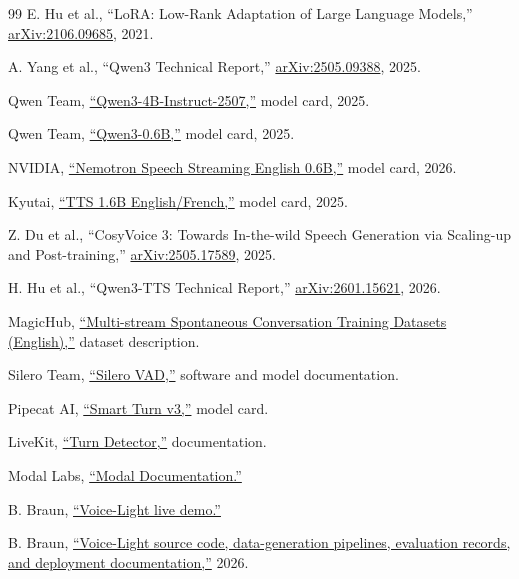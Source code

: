 \documentclass[10pt,twocolumn]{article}
\begin{document}
\begin{thebibliography}{99}
E. Hu et al., ``LoRA: Low-Rank Adaptation of Large Language Models,''
\href{https://arxiv.org/abs/2106.09685}{arXiv:2106.09685}, 2021.

A. Yang et al., ``Qwen3 Technical Report,''
\href{https://arxiv.org/abs/2505.09388}{arXiv:2505.09388}, 2025.

Qwen Team, \href{https://huggingface.co/Qwen/Qwen3-4B-Instruct-2507}
{``Qwen3-4B-Instruct-2507,''} model card, 2025.

Qwen Team, \href{https://huggingface.co/Qwen/Qwen3-0.6B}{``Qwen3-0.6B,''} model card, 2025.

NVIDIA, \href{https://huggingface.co/nvidia/nemotron-speech-streaming-en-0.6b}
{``Nemotron Speech Streaming English 0.6B,''} model card, 2026.

Kyutai, \href{https://huggingface.co/kyutai/tts-1.6b-en_fr}{``TTS 1.6B English/French,''}
model card, 2025.

Z. Du et al., ``CosyVoice 3: Towards In-the-wild Speech Generation via Scaling-up and Post-training,''
\href{https://arxiv.org/abs/2505.17589}{arXiv:2505.17589}, 2025.

H. Hu et al., ``Qwen3-TTS Technical Report,''
\href{https://arxiv.org/abs/2601.15621}{arXiv:2601.15621}, 2026.

MagicHub, \href{https://magichub.com/datasets/multi-stream-spontaneous-conversation-training-datasets_english/}
{``Multi-stream Spontaneous Conversation Training Datasets (English),''} dataset description.

Silero Team, \href{https://github.com/snakers4/silero-vad}{``Silero VAD,''} software and model
documentation.

Pipecat AI, \href{https://huggingface.co/pipecat-ai/smart-turn-v3}{``Smart Turn v3,''} model card.

LiveKit, \href{https://docs.livekit.io/agents/logic/turns/turn-detector/}
{``Turn Detector,''} documentation.

Modal Labs, \href{https://modal.com/docs}{``Modal Documentation.''}

B. Braun, \href{https://voice.bertil-braun.de}{``Voice-Light live demo.''}

B. Braun, \href{https://github.com/BertilBraun/Voice-Light}{``Voice-Light source code,
data-generation pipelines, evaluation records, and deployment documentation,''} 2026.


\end{thebibliography}
\end{document}
